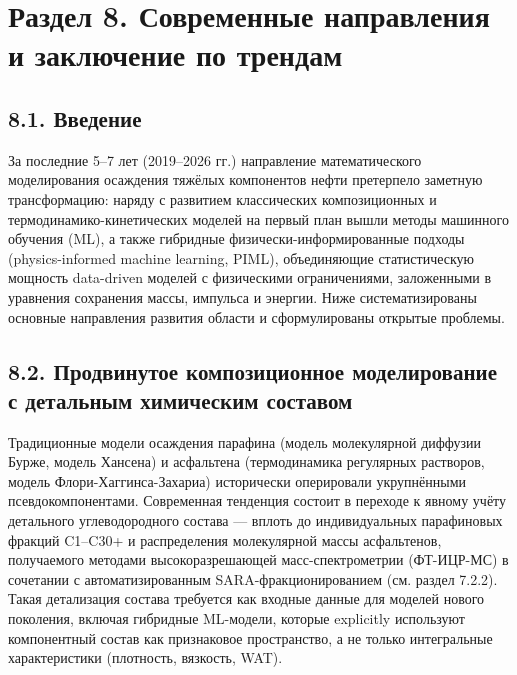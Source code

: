 \documentclass[11pt]{extarticle}
\begin{document}
\newpage

\section{Раздел 8. Современные направления и заключение по трендам}\label{ux440ux430ux437ux434ux435ux43b-8.-ux441ux43eux432ux440ux435ux43cux435ux43dux43dux44bux435-ux43dux430ux43fux440ux430ux432ux43bux435ux43dux438ux44f-ux438-ux437ux430ux43aux43bux44eux447ux435ux43dux438ux435-ux43fux43e-ux442ux440ux435ux43dux434ux430ux43c}

\subsection{8.1. Введение}\label{ux432ux432ux435ux434ux435ux43dux438ux435-2}

За последние 5--7 лет (2019--2026 гг.) направление математического моделирования осаждения тяжёлых компонентов нефти претерпело заметную трансформацию: наряду с развитием классических композиционных и термодинамико-кинетических моделей на первый план вышли методы машинного обучения (ML), а также гибридные физически-информированные подходы (physics-informed machine learning, PIML), объединяющие статистическую мощность data-driven моделей с физическими ограничениями, заложенными в уравнения сохранения массы, импульса и энергии. Ниже систематизированы основные направления развития области и сформулированы открытые проблемы.

\subsection{8.2. Продвинутое композиционное моделирование с детальным химическим составом}\label{ux43fux440ux43eux434ux432ux438ux43dux443ux442ux43eux435-ux43aux43eux43cux43fux43eux437ux438ux446ux438ux43eux43dux43dux43eux435-ux43cux43eux434ux435ux43bux438ux440ux43eux432ux430ux43dux438ux435-ux441-ux434ux435ux442ux430ux43bux44cux43dux44bux43c-ux445ux438ux43cux438ux447ux435ux441ux43aux438ux43c-ux441ux43eux441ux442ux430ux432ux43eux43c}

Традиционные модели осаждения парафина (модель молекулярной диффузии Бурже, модель Хансена) и асфальтена (термодинамика регулярных растворов, модель Флори-Хаггинса-Захариа) исторически оперировали укрупнёнными псевдокомпонентами. Современная тенденция состоит в переходе к явному учёту детального углеводородного состава --- вплоть до индивидуальных парафиновых фракций C1--C30+ и распределения молекулярной массы асфальтенов, получаемого методами высокоразрешающей масс-спектрометрии (ФТ-ИЦР-МС) в сочетании с автоматизированным SARA-фракционированием (см. раздел 7.2.2). Такая детализация состава требуется как входные данные для моделей нового поколения, включая гибридные ML-модели, которые explicitly используют компонентный состав как признаковое пространство, а не только интегральные характеристики (плотность, вязкость, WAT).
\end{document}
